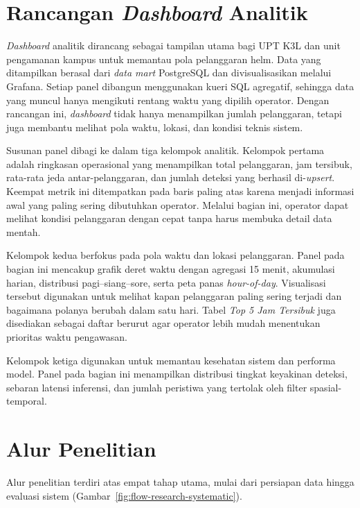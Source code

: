 \section{Rancangan \textit{Dashboard} Analitik}
\label{sec:rancangan-dashboard}

\textit{Dashboard} analitik dirancang sebagai tampilan utama bagi UPT K3L dan unit pengamanan kampus untuk memantau pola pelanggaran helm. Data yang ditampilkan berasal dari \textit{data mart} PostgreSQL dan divisualisasikan melalui Grafana. Setiap panel dibangun menggunakan kueri SQL agregatif, sehingga data yang muncul hanya mengikuti rentang waktu yang dipilih operator. Dengan rancangan ini, \textit{dashboard} tidak hanya menampilkan jumlah pelanggaran, tetapi juga membantu melihat pola waktu, lokasi, dan kondisi teknis sistem.

Susunan panel dibagi ke dalam tiga kelompok analitik. Kelompok pertama adalah ringkasan operasional yang menampilkan total pelanggaran, jam tersibuk, rata-rata jeda antar-pelanggaran, dan jumlah deteksi yang berhasil di-\textit{upsert}. Keempat metrik ini ditempatkan pada baris paling atas karena menjadi informasi awal yang paling sering dibutuhkan operator. Melalui bagian ini, operator dapat melihat kondisi pelanggaran dengan cepat tanpa harus membuka detail data mentah.

Kelompok kedua berfokus pada pola waktu dan lokasi pelanggaran. Panel pada bagian ini mencakup grafik deret waktu dengan agregasi 15 menit, akumulasi harian, distribusi pagi--siang--sore, serta peta panas \textit{hour-of-day}. Visualisasi tersebut digunakan untuk melihat kapan pelanggaran paling sering terjadi dan bagaimana polanya berubah dalam satu hari. Tabel \textit{Top 5 Jam Tersibuk} juga disediakan sebagai daftar berurut agar operator lebih mudah menentukan prioritas waktu pengawasan.

Kelompok ketiga digunakan untuk memantau kesehatan sistem dan performa model. Panel pada bagian ini menampilkan distribusi tingkat keyakinan deteksi, sebaran latensi inferensi, dan jumlah peristiwa yang tertolak oleh filter spasial-temporal.


\section{Alur Penelitian}
\label{sec:alur_penelitian}
Alur penelitian terdiri atas empat tahap utama, mulai dari persiapan data hingga evaluasi sistem (Gambar~\ref{fig:flow-research-systematic}).

